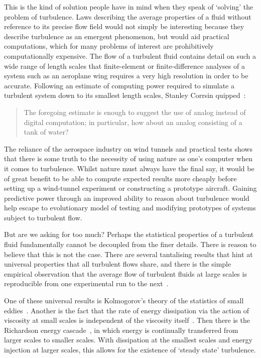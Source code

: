This is the kind of solution people have in mind when they speak of `solving' the problem of turbulence. Laws describing the average properties of a fluid without reference to its precise flow field would not simply be interesting because they describe turbulence as an emergent phenomenon, but would aid practical computations, which for many problems of interest are prohibitively computationally expensive. The flow of a turbulent fluid contains detail on such a  wide range of length scales that finite-element or finite-difference analyses of a system such as an aeroplane wing requires a very high resolution in order to be accurate. Following an estimate of computing power required to simulate a turbulent system down to its smallest length scales, Stanley Corrsin quipped~\cite{corrsin_turbulent_1961}:
\begin{quote}
The foregoing estimate  is enough to suggest the use of analog instead of digital  computation; in particular, how about an analog consisting of a tank of water?
\end{quote}
The reliance of the aerospace industry on wind tunnels and practical tests shows that there is some truth to the necessity of using nature as one's computer when it comes to turbulence. Whilst nature must always have the final say, it would be of great benefit to be able to compute expected results more cheaply before setting up a wind-tunnel experiment or constructing a prototype aircraft. Gaining predictive power through an improved ability to reason about turbulence would help escape to evolutionary model of testing and modifying prototypes of systems subject to turbulent flow.

But are we asking for too much? Perhaps the statistical properties of a turbulent fluid fundamentally cannot be decoupled from the finer details. There is reason to believe that this is not the case. There are several tantalising results that hint at universal properties that all turbulent flows share, and there is the simple empirical observation that the average flow of turbulent fluids at large scales is reproducible from one experimental run to the next~\cite[pp 13, 86]{davidson_turbulence:_2004}.

One of these universal results is Kolmogorov's theory of the statistics of small eddies~\cite{kolmogorov_local_1941, spalding_kolmogorovs_1991}. Another is the fact that the rate of energy dissipation via the action of viscosity at small scales is independent of the viscosity itself~\cite[p 77]{davidson_turbulence:_2004}. Then there is the Richardson energy cascade~\cite{richardson_weather_2007}, in which energy is continually transferred from larger scales to smaller scales. With dissipation at the smallest scales and energy injection at larger scales, this allows for the existence of `steady state' turbulence.

